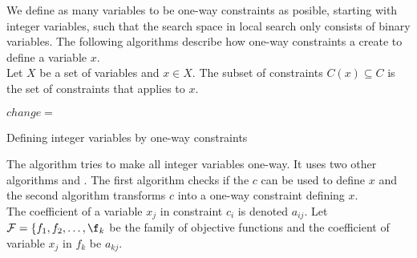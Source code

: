 We define as many variables to be one-way constraints as posible, starting with integer variables, such that the search 
space in local search only consists of binary variables. The following algorithms describe how one-way 
constraints a create to define a variable $x$. \\ 
Let $X$ be a set of variables and $x \in X$. The subset of constraints $C(x) \subseteq C$ is the set 
of constraints that applies to $x$.\\ 
\IncMargin{1em}
\begin{algorithm}[H]

\algdata 
{}
\BlankLine
\Bool $change = $ \true\;
\caption{Defining integer variables by one-way constraints}\label{algo_defintvar}
\end{algorithm}\DecMargin{1em}
\noindent
The algorithm tries to make all integer variables one-way. It uses two other algorithms 
 and . The first algorithm checks if the 
\cons $c$ can be used to define \var $x$ and the second algorithm transforms $c$ into a one-way constraint defining 
$x$.  \\ 
The coefficient of a variable $x_j$ in constraint $c_i$ is denoted $a_{ij}$. Let $\mathcal{F} = \{f_1,f_2,\dots ,\f_k$ 
be the family of objective functions and the coefficient of variable $x_j$ in $f_k$ be $a_{kj}$.  		 \\  

